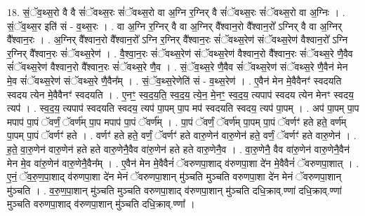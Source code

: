 \documentclass[17pt]{extarticle}
\begin{document}
18. सं॒ॅव॒थ्स॒रो वै वै सं॑ॅवथ्स॒रः सं॑ॅवथ्स॒रो वा अ॒ग्नि र॒ग्निर् वै सं॑ॅवथ्स॒रः सं॑ॅवथ्स॒रो वा अ॒ग्निः । . सं॒ॅव॒थ्स॒र इति॑ सं - व॒थ्स॒रः । . वा अ॒ग्नि र॒ग्निर् वै वा अ॒ग्निर् वै᳚श्वान॒रो वै᳚श्वान॒रो᳚ ऽग्निर् वै वा अ॒ग्निर् वै᳚श्वान॒रः । . अ॒ग्निर् वै᳚श्वान॒रो वै᳚श्वान॒रो᳚ ऽग्नि र॒ग्निर् वै᳚श्वान॒रः सं॑ॅवथ्स॒रेण॑ संॅवथ्स॒रेण॑ वैश्वान॒रो᳚ ऽग्नि र॒ग्निर् वै᳚श्वान॒रः सं॑ॅवथ्स॒रेण॑ । . वै॒श्वा॒न॒रः सं॑ॅवथ्स॒रेण॑ संॅवथ्स॒रेण॑ वैश्वान॒रो वै᳚श्वान॒रः सं॑ॅवथ्स॒रे णै॒वैव सं॑ॅवथ्स॒रेण॑ वैश्वान॒रो वै᳚श्वान॒रः सं॑ॅवथ्स॒रे णै॒व । . सं॒ॅव॒थ्स॒रे णै॒वैव सं॑ॅवथ्स॒रेण॑ संॅवथ्स॒रे णै॒वैन॑ मेन मे॒व सं॑ॅवथ्स॒रेण॑ संॅवथ्स॒रे णै॒वैन᳚म् । . सं॒ॅव॒थ्स॒रेणेति॑ सं - व॒थ्स॒रेण॑ । . ए॒वैन॑ मेन मे॒वैवैनꣳ॑ स्वदयति स्वदय त्येन मे॒वैवैनꣳ॑ स्वदयति । . ए॒नꣳ॒॒ स्व॒द॒य॒ति॒ स्व॒द॒य॒ त्ये॒न॒ मे॒नꣳ॒॒ स्व॒द॒य॒ त्यपाप॑ स्वदय त्येन मेनꣳ स्वदय॒ त्यप॑ । . स्व॒द॒य॒ त्यपाप॑ स्वदयति स्वदय॒ त्यप॑ पा॒पम् पा॒प मप॑ स्वदयति स्वदय॒ त्यप॑ पा॒पम् । . अप॑ पा॒पम् पा॒प मपाप॑ पा॒पं ॅवर्णं॒ ॅवर्ण॑म् पा॒प मपाप॑ पा॒पं ॅवर्ण᳚म् । . पा॒पं ॅवर्णं॒ ॅवर्ण॑म् पा॒पम् पा॒पं ॅवर्णꣳ॑ हते हते॒ वर्ण॑म् पा॒पम् पा॒पं ॅवर्णꣳ॑ हते । . वर्णꣳ॑ हते हते॒ वर्णं॒ ॅवर्णꣳ॑ हते वारु॒णेन॑ वारु॒णेन॑ हते॒ वर्णं॒ ॅवर्णꣳ॑ हते वारु॒णेन॑ । . ह॒ते॒ वा॒रु॒णेन॑ वारु॒णेन॑ हते हते वारु॒णेनै॒वैव वा॑रु॒णेन॑ हते हते वारु॒णेनै॒व । . वा॒रु॒णेनै॒ वैव वा॑रु॒णेन॑ वारु॒णेनै॒वैन॑ मेन मे॒व वा॑रु॒णेन॑ वारु॒णेनै॒वैन᳚म् । . ए॒वैन॑ मेन मे॒वैवैनं॑ ॅवरुणपा॒शाद् व॑रुणपा॒शा दे॑न मे॒वैवैनं॑ ॅवरुणपा॒शात् । . ए॒नं॒ ॅव॒रु॒ण॒पा॒शाद् व॑रुणपा॒शा दे॑न मेनं ॅवरुणपा॒शान् मु॑ञ्चति मुञ्चति वरुणपा॒शा दे॑न मेनं ॅवरुणपा॒शान् मु॑ञ्चति । . व॒रु॒ण॒पा॒शान् मु॑ञ्चति मुञ्चति वरुणपा॒शाद् व॑रुणपा॒शान् मु॑ञ्चति दधि॒क्राव्.ण्णा॑ दधि॒क्राव्.ण्णा॑ मुञ्चति वरुणपा॒शाद् व॑रुणपा॒शान् मु॑ञ्चति दधि॒क्राव्.ण्णा᳚ । \newline
\end{document}

